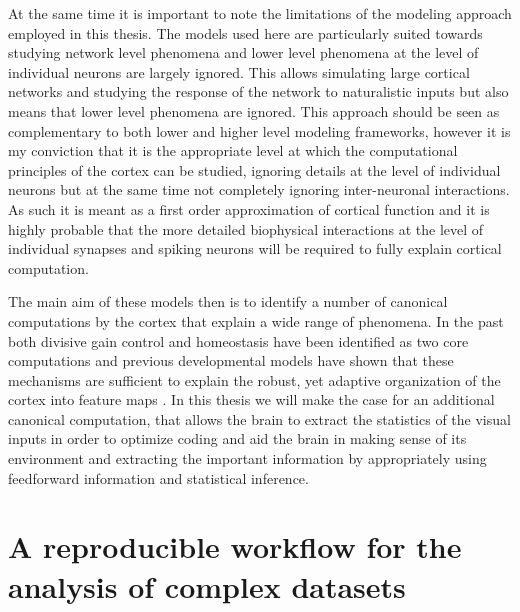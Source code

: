 At the same time it is important to note the limitations of the
modeling approach employed in this thesis. The models used here are
particularly suited towards studying network level phenomena and lower
level phenomena at the level of individual neurons are largely
ignored. This allows simulating large cortical networks and studying
the response of the network to naturalistic inputs but also means that
lower level phenomena are ignored. This approach should be seen as
complementary to both lower and higher level modeling frameworks,
however it is my conviction that it is the appropriate level at which
the computational principles of the cortex can be studied, ignoring
details at the level of individual neurons but at the same time not
completely ignoring inter-neuronal interactions. As such it is meant as
a first order approximation of cortical function and it is highly
probable that the more detailed biophysical interactions at the level
of individual synapses and spiking neurons will be required to fully
explain cortical computation.

The main aim of these models then is to identify a number of canonical
computations by the cortex that explain a wide range of phenomena. In
the past both divisive gain control \citep{Carandini2012} and
homeostasis \citep{Marder2006} have been identified as two core
computations and previous developmental models have shown that these
mechanisms are sufficient to explain the robust, yet adaptive
organization of the cortex into feature maps \citep{Stevens2013}. In
this thesis we will make the case for an additional canonical
computation, that allows the brain to extract the statistics of the
visual inputs in order to optimize coding and aid the brain in making
sense of its environment and extracting the important information by
appropriately using feedforward information and statistical inference.

\section{A reproducible workflow for the analysis of complex datasets}

